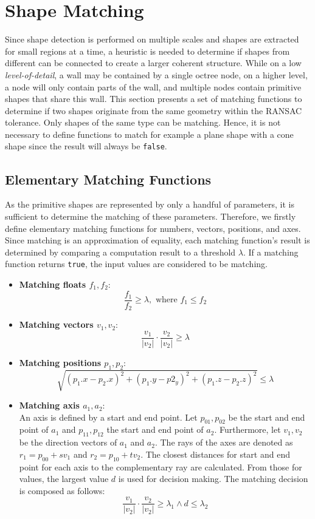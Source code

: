 \section{Shape Matching}
\label{sec:shapeMatching}

Since shape detection is performed on multiple scales and shapes are extracted for small regions at a time, a heuristic is needed to determine if shapes from different can be connected to create a larger coherent structure. While on a low \textit{level-of-detail}, a wall may be contained by a single octree node, on a higher level, a node will only contain parts of the wall, and multiple nodes contain primitive shapes that share this wall. This section presents a set of matching functions to determine if two shapes originate from the same geometry within the RANSAC tolerance. Only shapes of the same type can be matching. Hence, it is not necessary to define functions to match for example a plane shape with a cone shape since the result will always be \verb|false|. 


\subsection{Elementary Matching Functions}
\label{sec:elementarMatchingFuns}

As the primitive shapes are represented by only a handful of parameters, it is sufficient to determine the matching of these parameters. Therefore, we firstly define elementary matching functions for numbers, vectors, positions, and axes. Since matching is an approximation of equality, each matching function's result is determined by comparing a computation result to a threshold $\lambda$. If a matching function returns \verb|true|, the input values are considered to be matching. 

\begin{itemize}
    \item \textbf{Matching floats $f_1, f_2$}: 
        $$\frac{f_1}{f_2} \geq \lambda, \textrm{ where } f_1 \leq f_2$$  
    \item \textbf{Matching vectors $v_1, v_2$}: 
        $$\frac{v_1}{|v_2|} \cdot \frac{v_2}{|v_2|} \geq \lambda$$
    \item \textbf{Matching positions $p_1, p_2$}: 
        $$\sqrt{(p_1.x - p_2.x)^2 + (p_1.y - p2_y)^2 + (p_1.z - p_2.z)^2} \leq \lambda$$
    \item \textbf{Matching axis $a_1, a_2$}: 
    \\
    An axis is defined by a start and end point. Let $p_{01},p_{02}$ be the start and end point of $a_1$ and $p_{11}, p_{12}$ the start and end point of $a_2$. Furthermore, let $v_1, v_2$ be the direction vectors of $a_1$ and $a_2$. The rays of the axes are denoted as $r_1 = p_{00} + sv_1$ and $r_2 = p_{10} + tv_2$. The closest distances for start and end point for each axis to the complementary ray are calculated. From those for values, the largest value $d$ is used for decision making. The matching decision is composed as follows: 
        $$\frac{v_1}{|v_2|} \cdot \frac{v_2}{|v_2|} \geq \lambda_1 \land d \leq \lambda_2$$
\end{itemize}



